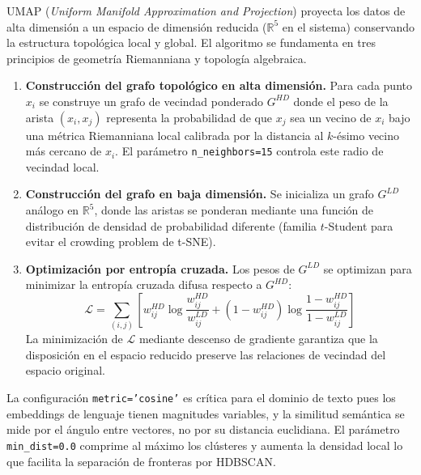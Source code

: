 UMAP (\textit{Uniform Manifold Approximation and Projection}) \cite{mcinnes2018umap}
proyecta los datos de alta dimensión a un espacio de dimensión reducida ($\mathbb{R}^5$
en el sistema) conservando la estructura topológica local y global. El algoritmo se
fundamenta en tres principios de geometría Riemanniana y topología algebraica.

\begin{enumerate}
    \item \textbf{Construcción del grafo topológico en alta dimensión.} Para cada
          punto $x_i$ se construye un grafo de vecindad ponderado $G^{HD}$ donde
          el peso de la arista $(x_i, x_j)$ representa la probabilidad de que
          $x_j$ sea un vecino de $x_i$ bajo una métrica Riemanniana local calibrada
          por la distancia al $k$-ésimo vecino más cercano de $x_i$. El parámetro
          \texttt{n\_neighbors=15} controla este radio de vecindad local.

    \item \textbf{Construcción del grafo en baja dimensión.} Se inicializa un grafo
          $G^{LD}$ análogo en $\mathbb{R}^5$, donde las aristas se ponderan mediante
          una función de distribución de densidad de probabilidad diferente (familia
          $t$-Student para evitar el crowding problem de t-SNE).

    \item \textbf{Optimización por entropía cruzada.} Los pesos de $G^{LD}$ se
          optimizan para minimizar la entropía cruzada difusa respecto a $G^{HD}$:
          \begin{equation}
              \mathcal{L} = \sum_{(i,j)} \left[ w_{ij}^{HD} \log\frac{w_{ij}^{HD}}{w_{ij}^{LD}}
              + (1 - w_{ij}^{HD}) \log\frac{1 - w_{ij}^{HD}}{1 - w_{ij}^{LD}} \right]
          \end{equation}
          La minimización de $\mathcal{L}$ mediante descenso de gradiente
          garantiza que la disposición en el espacio reducido preserve las relaciones
          de vecindad del espacio original.
\end{enumerate}

La configuración \texttt{metric='cosine'} es crítica para el dominio de texto pues los
embeddings de lenguaje tienen magnitudes variables, y la similitud semántica se
mide por el ángulo entre vectores, no por su distancia euclidiana. El parámetro
\texttt{min\_dist=0.0} comprime al máximo los clústeres y aumenta la densidad
local lo que facilita la separación de fronteras por HDBSCAN.


